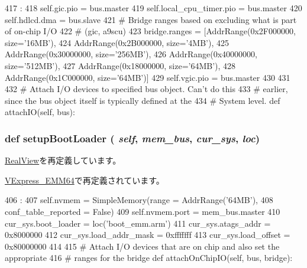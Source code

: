 \begin{DoxyCode}
417                                          :
418        self.gic.pio = bus.master
419        self.local_cpu_timer.pio = bus.master
420        self.hdlcd.dma           = bus.slave
421        # Bridge ranges based on excluding what is part of on-chip I/O
422        # (gic, a9scu)
423        bridge.ranges = [AddrRange(0x2F000000, size='16MB'),
424                         AddrRange(0x2B000000, size='4MB'),
425                         AddrRange(0x30000000, size='256MB'),
426                         AddrRange(0x40000000, size='512MB'),
427                         AddrRange(0x18000000, size='64MB'),
428                         AddrRange(0x1C000000, size='64MB')]
429        self.vgic.pio = bus.master
430 
431 
432     # Attach I/O devices to specified bus object.  Can't do this
433     # earlier, since the bus object itself is typically defined at the
434     # System level.
    def attachIO(self, bus):
\end{DoxyCode}
\hypertarget{classRealView_1_1VExpress__EMM_a2bb8c2dabea2e4801ca416188787ef11}{
\subsubsection[{setupBootLoader}]{\setlength{\rightskip}{0pt plus 5cm}def setupBootLoader ( {\em self}, \/   {\em mem\_\-bus}, \/   {\em cur\_\-sys}, \/   {\em loc})}}
\label{classRealView_1_1VExpress__EMM_a2bb8c2dabea2e4801ca416188787ef11}


\hyperlink{classRealView_1_1RealView_a2bb8c2dabea2e4801ca416188787ef11}{RealView}を再定義しています。

\hyperlink{classRealView_1_1VExpress__EMM64_a2bb8c2dabea2e4801ca416188787ef11}{VExpress\_\-EMM64}で再定義されています。


\begin{DoxyCode}
406                                                     :
407         self.nvmem = SimpleMemory(range = AddrRange('64MB'),
408                                   conf_table_reported = False)
409         self.nvmem.port = mem_bus.master
410         cur_sys.boot_loader = loc('boot_emm.arm')
411         cur_sys.atags_addr = 0x8000000
412         cur_sys.load_addr_mask = 0xfffffff
413         cur_sys.load_offset = 0x80000000
414 
415     # Attach I/O devices that are on chip and also set the appropriate
416     # ranges for the bridge
    def attachOnChipIO(self, bus, bridge):
\end{DoxyCode}


